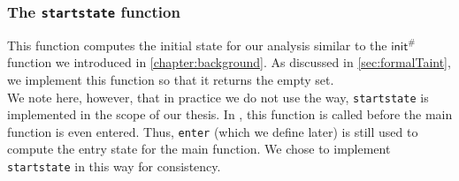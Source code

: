      \subsubsection{The \texttt{startstate} function}
        This function computes the initial state for our analysis similar to the $\textsf{init}^{\#}$ function we introduced in \autoref{chapter:background}. As discussed in \autoref{sec:formalTaint}, we implement this function so that it returns the empty set.\\
        We note here, however, that in practice we do not use the way, \texttt{startstate} is implemented in the scope of our thesis. In \gob, this function is called before the main function is even entered. Thus, \texttt{enter} (which we define later) is still used to compute the entry state for the main function. We chose to implement \texttt{startstate} in this way for consistency.

